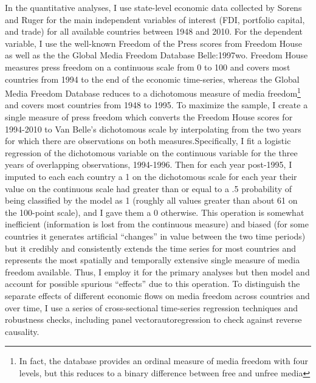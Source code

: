 \documentclass[a4paper]{article}\usepackage[]{graphicx}\usepackage[]{color}
\begin{document}
In the quantitative analyses, I use state-level economic data collected by Sorens and Ruger \parencite*{Sorens:2012hc} for the main independent variables of interest (FDI, portfolio capital, and trade) for all available countries between 1948 and 2010. For the dependent variable, I use the well-known Freedom of the Press scores from Freedom House \parencite*{FreedomHouse:2011vv} as well as the the Global Media Freedom Database \parencite{van2000press}{Belle:1997wo}. Freedom House measures press freedom on a continuous scale from 0 to 100 and covers most countries from 1994 to the end of the economic time-series, whereas the Global Media Freedom Database reduces to a dichotomous measure of media freedom\footnote{In fact, the database provides an ordinal measure of media freedom with four levels, but this reduces to a binary difference between free and unfree media} and covers most countries from 1948 to 1995. To maximize the sample, I create a single measure of press freedom which converts the Freedom House scores for 1994-2010 to Van Belle's dichotomous scale by interpolating from the two years for which there are observations on both measures.Specifically, I fit a logistic regression of the dichotomous variable on the continuous variable for the three years of overlapping observations, 1994-1996. Then for each year post-1995, I imputed to each each country a 1 on the dichotomous scale for each year their value on the continuous scale had greater than or equal to a .5 probability of being classified by the model as 1 (roughly all values greater than about 61 on the 100-point scale), and I gave them a 0 otherwise. This operation is somewhat inefficient (information is lost from the continuous measure) and biased (for some countries it generates artificial “changes” in value between the two time periods) but it credibly and consistently extends the time series for most countries and represents the most spatially and temporally extensive single measure of media freedom available. Thus, I employ it for the primary analyses but then model and account for possible spurious “effects” due to this operation. To distinguish the separate effects of different economic flows on media freedom across countries and over time, I use a series of cross-sectional time-series regression techniques and robustness checks, including panel vectorautoregression to check against reverse causality.
\end{document}
